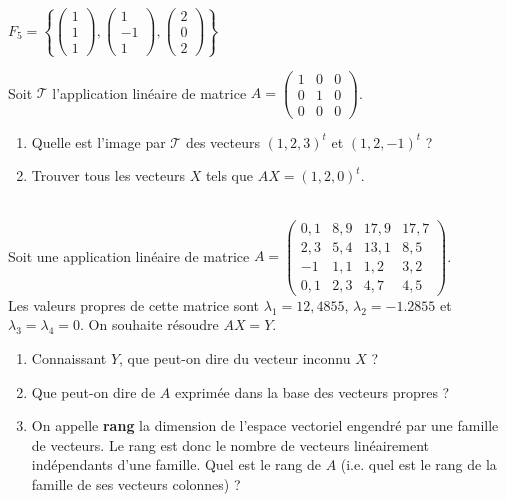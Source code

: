 \documentclass[12pt,a4paper]{report}
\newcounter{exo}[section]
\begin{document}
$F_5=\left\{	\begin{pmatrix}1\\1\\1\end{pmatrix},\begin{pmatrix}1\\-1\\1\end{pmatrix},\begin{pmatrix}2\\0\\2\end{pmatrix}\right\}$~~~~


\exo

Soit $\mathcal{T}$ l'application linéaire de matrice $A=\begin{pmatrix} 1&0&0\\0&1&0\\0&0&0\end{pmatrix}$. 
\begin{enumerate}
	\item Quelle est l'image par $\mathcal{T}$ des vecteurs $(1,2,3)^t$ et $(1,2,-1)^t$ ?
	\item Trouver tous les vecteurs $X$ tels que $AX=(1,2,0)^t$.
\end{enumerate}

\exo\\
\indent Soit une application linéaire de matrice $A=\begin{pmatrix}
		0,1&8,9&17,9&17,7\\
		2,3&5,4&13,1&8,5\\
		-1&1,1&1,2&3,2\\
		0,1&2,3&4,7&4,5
	 \end{pmatrix}$.\\

\indent Les valeurs propres de cette matrice sont $\lambda_1=12,4855$, $\lambda_2=-1.2855$ et $\lambda_3=\lambda_4=0$. On souhaite résoudre $AX=Y$.
\begin{enumerate}
	\item Connaissant $Y$, que peut-on dire du vecteur inconnu $X$ ?
	\item Que peut-on dire de $A$ exprimée dans la base des vecteurs propres ?
	\item On appelle \textbf{rang} la dimension de l'espace vectoriel engendré par une famille de vecteurs. Le rang est donc le nombre de vecteurs linéairement indépendants d'une famille. Quel est le rang de $A$ (i.e. quel est le rang de la famille de ses vecteurs colonnes) ?
\end{enumerate}
\end{document}
